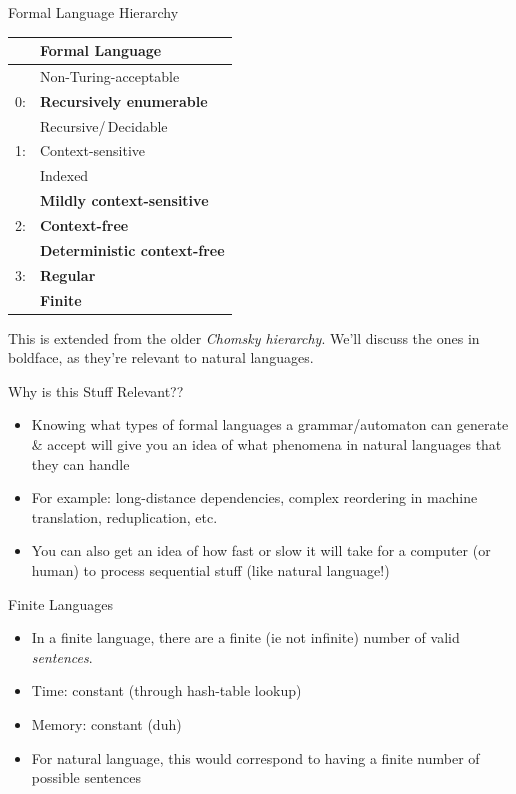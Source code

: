 \documentclass{beamer}
\begin{document}
\begin{frame}{Formal Language Hierarchy}
\begin{center}
\begin{tabular}{|ll|}
\hline
& Formal Language \\
\hline
\hline
& Non-Turing-acceptable\\
\hline
0: & \bf Recursively enumerable \\
\hline
& Recursive/\,Decidable \\
\hline
1: & Context-sensitive \\
\hline
& Indexed \\
\hline
& \bf Mildly context-sensitive \\
\hline
2: & \bf Context-free \\
\hline
& \bf Deterministic context-free \\
\hline
3: & \bf Regular \\
\hline
& \bf Finite \\
\hline
\end{tabular}
\end{center}
\pause
\footnotesize{This is extended from the older \textit{Chomsky hierarchy}. \pause We'll discuss the ones in boldface, as they're relevant to natural languages.}
\end{frame}


\begin{frame}{Why is this Stuff Relevant??}
\begin{block}{}
\begin{itemize}
	\item Knowing what types of formal languages a grammar/automaton can generate \& accept will give you an idea of what phenomena in natural languages that they can handle
	\pause
	\item For example: long-distance dependencies, complex reordering in machine translation, reduplication, etc.
	\pause
	\item You can also get an idea of how fast or slow it will take for a computer (or human) to process sequential stuff (like natural language!)
\end{itemize}
\end{block}
\end{frame}


\begin{frame}{Finite Languages}
\begin{block}{}
\begin{itemize}
	\item In a finite language, there are a finite (ie not infinite) number of valid \textit{sentences}.
	\item Time: constant (through hash-table lookup)
	\item Memory: constant (duh)
	\pause
	\item For natural language, this would correspond to having a finite number of possible sentences
\end{itemize}
\end{block}
\end{frame}
\end{document}
